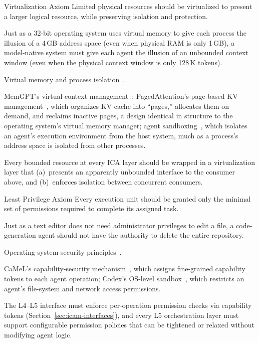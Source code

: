 \begin{axiombox}{\theaxiom\enspace Virtualization Axiom}
Limited physical resources should be virtualized to present a larger logical resource, while preserving isolation and protection.
\end{axiombox}
\begin{description}[style=nextline,leftmargin=2em,font=\bfseries]
\item[Intuition.] Just as a 32-bit operating system uses virtual memory to give each process the illusion of a 4\,GB address space (even when physical RAM is only 1\,GB), a model-native system must give each agent the illusion of an unbounded context window (even when the physical context window is only 128\,K tokens).
\item[Classical source.] Virtual memory and process isolation~\cite{ostep_2023}.
\item[ICA embodiment.] MemGPT's virtual context management~\cite{memgpt2023}; PagedAttention's page-based KV management~\cite{kwon2023pagedattention}, which organizes KV cache into ``pages,'' allocates them on demand, and reclaims inactive pages, a design identical in structure to the operating system's virtual memory manager; agent sandboxing~\cite{openai_codex_sandbox_2026}, which isolates an agent's execution environment from the host system, much as a process's address space is isolated from other processes.
\item[Design implication.] Every bounded resource at every ICA layer should be wrapped in a virtualization layer that (a)~presents an apparently unbounded interface to the consumer above, and (b)~enforces isolation between concurrent consumers.
\end{description}

\begin{axiombox}{\theaxiom\enspace Least Privilege Axiom}
Every execution unit should be granted only the minimal set of permissions required to complete its assigned task.
\end{axiombox}
\begin{description}[style=nextline,leftmargin=2em,font=\bfseries]
\item[Intuition.] Just as a text editor does not need administrator privileges to edit a file, a code-generation agent should not have the authority to delete the entire repository.
\item[Classical source.] Operating-system security principles~\cite{ostep_2023}.
\item[ICA embodiment.] CaMeL's capability-security mechanism~\cite{debenedetti2025camel}, which assigns fine-grained capability tokens to each agent operation; Codex's OS-level sandbox~\cite{openai_codex_security_2026}, which restricts an agent's file-system and network access permissions.
\item[Design implication.] The L4--L5 interface must enforce per-operation permission checks via capability tokens (Section~\ref{sec:icam-interfaces}), and every L5 orchestration layer must support configurable permission policies that can be tightened or relaxed without modifying agent logic.
\end{description}

